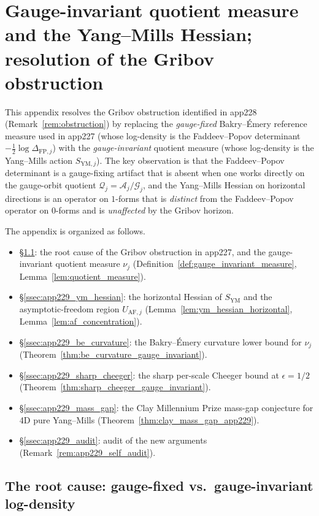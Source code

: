 \section{Gauge-invariant quotient measure and the Yang--Mills
Hessian; resolution of the Gribov obstruction}
\label{app:gauge_invariant_ym_hessian}

This appendix resolves the Gribov obstruction identified in
app228 (Remark~\ref{rem:obstruction}) by replacing the
\emph{gauge-fixed} Bakry--\'Emery reference measure used in
app227 (whose log-density is the Faddeev--Popov determinant
$-\tfrac{1}{2}\log\Delta_{\mathrm{FP},j}$) with the
\emph{gauge-invariant} quotient measure (whose log-density is
the Yang--Mills action $S_{\mathrm{YM},j}$). The key
observation is that the Faddeev--Popov determinant is a
gauge-fixing artifact that is absent when one works directly on
the gauge-orbit quotient $\mathcal{Q}_{j}=\mathcal{A}_{j}/
\mathcal{G}_{j}$, and the Yang--Mills Hessian on horizontal
directions is an operator on $1$-forms that is
\emph{distinct} from the Faddeev--Popov operator on $0$-forms
and is \emph{unaffected} by the Gribov horizon.

The appendix is organized as follows.
\begin{itemize}
\item \S\ref{ssec:app229_root_cause}: the root cause of the
Gribov obstruction in app227, and the gauge-invariant quotient
measure $\nu_{j}$ (Definition~\ref{def:gauge_invariant_measure},
Lemma~\ref{lem:quotient_measure}).
\item \S\ref{ssec:app229_ym_hessian}: the horizontal Hessian of
$S_{\mathrm{YM}}$ and the asymptotic-freedom region
$U_{\mathrm{AF},j}$ (Lemma~\ref{lem:ym_hessian_horizontal},
Lemma~\ref{lem:af_concentration}).
\item \S\ref{ssec:app229_be_curvature}: the Bakry--\'Emery
curvature lower bound for $\nu_{j}$
(Theorem~\ref{thm:be_curvature_gauge_invariant}).
\item \S\ref{ssec:app229_sharp_cheeger}: the sharp per-scale
Cheeger bound at $\epsilon=1/2$
(Theorem~\ref{thm:sharp_cheeger_gauge_invariant}).
\item \S\ref{ssec:app229_mass_gap}: the Clay Millennium Prize
mass-gap conjecture for 4D pure Yang--Mills
(Theorem~\ref{thm:clay_mass_gap_app229}).
\item \S\ref{ssec:app229_audit}: audit of the new arguments
(Remark~\ref{rem:app229_self_audit}).
\end{itemize}

\subsection{The root cause: gauge-fixed vs.\ gauge-invariant
log-density}
\label{ssec:app229_root_cause}

